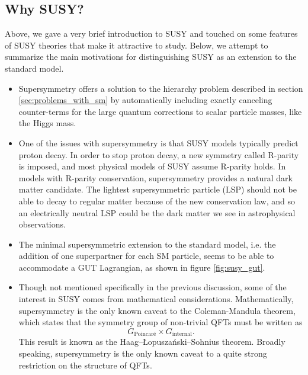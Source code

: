   \subsection{Why SUSY?}
    Above, we gave a very brief introduction to SUSY and touched on some features of SUSY theories that make it attractive to study. Below, we attempt to summarize the main motivations for distinguishing SUSY as an extension to the standard model.

    \begin{itemize}
    \item Supersymmetry offers a solution to the hierarchy problem described in section \ref{sec:problems_with_sm} by automatically including exactly canceling counter-terms for the large quantum corrections to scalar particle masses, like the Higgs mass.
    \item One of the issues with supersymmetry is that SUSY models typically predict proton decay. In order to stop proton decay, a new symmetry called R-parity is imposed, and most physical models of SUSY assume R-parity holds. In models with R-parity conservation, supersymmetry provides a natural dark matter candidate. The lightest supersymmetric particle (LSP) should not be able to decay to regular matter because of the new conservation law, and so an electrically neutral LSP could be the dark matter we see in astrophysical observations.
    \item The minimal supersymmetric extension to the standard model, i.e. the addition of one superpartner for each SM particle, seems to be able to accommodate a GUT Lagrangian, as shown in figure \ref{fig:susy_gut}.
    \item Though not mentioned specifically in the previous discussion, some of the interest in SUSY comes from mathematical considerations. Mathematically, supersymmetry is the only known caveat to the Coleman-Mandula theorem, which states that the symmetry group of non-trivial QFTs must be written as
      \[
      G_{\text{Poincaré}} \times G_{\text{internal}}.
      \]
      This result is known as the Haag–Łopuszański–Sohnius theorem. Broadly speaking, supersymmetry is the only known caveat to a quite strong restriction on the structure of QFTs.
    \end{itemize}

